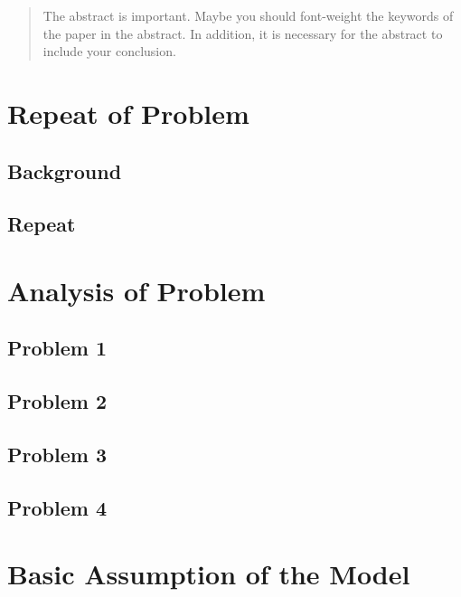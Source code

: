 \documentclass[a4paper,12pt]{article}
\begin{document}
\begin{CJK*}{GBK}{song}
\renewcommand{\abstractname}{\zihao{4}\heiti Abstract}
\begin{abstract}
The abstract is important. Maybe you should font-weight the keywords of the paper in the abstract. In addition, it is necessary for the abstract to include your conclusion.

\end{abstract}
\thispagestyle{empty}
\newpage



\section{Repeat of Problem}

\subsection{Background}

\subsection{Repeat}

\section{Analysis of Problem}
\subsection{Problem 1}

\subsection{Problem 2}

\subsection{Problem 3}

\subsection{Problem 4}


\section{Basic Assumption of the Model}


\end{CJK*}
\end{document}
